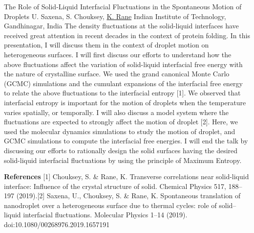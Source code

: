 
    \begin{abstract_online}{The Role of Solid-Liquid Interfacial Fluctuations in the Spontaneous Motion of Droplets}{%
        U. Saxena, S. Chouksey, \underline{K. Rane}}{%
        \IStag}{%
        Indian Institute of Technology, Gandhinagar, India}
    The density fluctuations at the solid-liquid interfaces have received great attention in recent decades in the context of protein folding. In this presentation, I will discuss them in the context of droplet motion on heterogeneous surfaces. I will first discuss our efforts to understand how the above fluctuations affect the variation of solid-liquid interfacial free energy with the nature of crystalline surface. We used the grand canonical Monte Carlo (GCMC) simulations and the cumulant expansions of the interfacial free energy to relate the above fluctuations to the interfacial entropy [1]. We observed that interfacial entropy is important for the motion of droplets when the temperature varies spatially, or temporally. I will also discuss a model system where the fluctuations are expected to strongly affect the motion of droplet [2]. Here, we used the molecular dynamics simulations to study the motion of droplet, and GCMC simulations to compute the interfacial free energies. I will end the talk by discussing our efforts to rationally design the solid surfaces having the desired solid-liquid interfacial fluctuations by using the principle of Maximum Entropy. 
    
        \textbf{References} \newline{}[1] Chouksey, S. & Rane, K. Transverse correlations near solid-liquid interface: Influence of the crystal structure of solid. Chemical Physics 517, 188–197 (2019).\newline{}[2] Saxena, U., Chouksey, S. & Rane, K. Spontaneous translation of nanodroplet over a heterogeneous surface due to thermal cycles: role of solid–liquid interfacial fluctuations. Molecular Physics 1–14 (2019). doi:10.1080/00268976.2019.1657191
    \end{abstract_online}
    